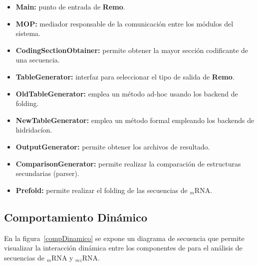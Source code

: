 \begin{itemize}
	\item \textbf{Main:} punto de entrada de \textbf{Remo}.
	\item \textbf{MOP:} mediador responsable de la comunicación entre los módulos del sistema.

	\item \textbf{CodingSectionObtainer:} permite obtener la mayor sección codificante de una secuencia.

	\item \textbf{TableGenerator:} interfaz para seleccionar el tipo de salida de \textbf{Remo}.

	\item \textbf{OldTableGenerator:} emplea un método ad-hoc usando los backend de folding.

	\item \textbf{NewTableGenerator:} emplea un método formal empleando los backends de hidridacíon.

	\item \textbf{OutputGenerator:} permite obtener los archivos de resultado.

	\item \textbf{ComparisonGenerator:} permite realizar la comparación de estructuras secundarias (parser).

	\item \textbf{Prefold:} permite realizar el folding de las secuencias de $_m$RNA. 
\end{itemize}

\subsection{Comportamiento Dinámico}
En la figura~\ref{compDinamico} se expone un diagrama de secuencia que permite visualizar la interacción dinámica entre los componentes de \remo para el análisis de secuencias de $_m$RNA y $_m$$_i$RNA.

